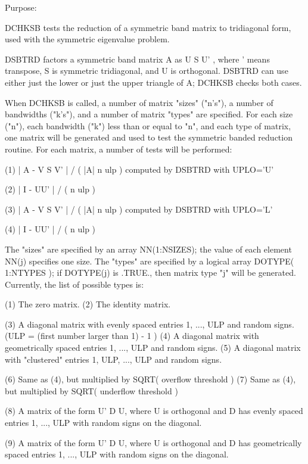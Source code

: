 \begin{DoxyParagraph}{Purpose\+: }
\begin{DoxyVerb} DCHKSB tests the reduction of a symmetric band matrix to tridiagonal
 form, used with the symmetric eigenvalue problem.

 DSBTRD factors a symmetric band matrix A as  U S U' , where ' means
 transpose, S is symmetric tridiagonal, and U is orthogonal.
 DSBTRD can use either just the lower or just the upper triangle
 of A; DCHKSB checks both cases.

 When DCHKSB is called, a number of matrix "sizes" ("n's"), a number
 of bandwidths ("k's"), and a number of matrix "types" are
 specified.  For each size ("n"), each bandwidth ("k") less than or
 equal to "n", and each type of matrix, one matrix will be generated
 and used to test the symmetric banded reduction routine.  For each
 matrix, a number of tests will be performed:

 (1)     | A - V S V' | / ( |A| n ulp )  computed by DSBTRD with
                                         UPLO='U'

 (2)     | I - UU' | / ( n ulp )

 (3)     | A - V S V' | / ( |A| n ulp )  computed by DSBTRD with
                                         UPLO='L'

 (4)     | I - UU' | / ( n ulp )

 The "sizes" are specified by an array NN(1:NSIZES); the value of
 each element NN(j) specifies one size.
 The "types" are specified by a logical array DOTYPE( 1:NTYPES );
 if DOTYPE(j) is .TRUE., then matrix type "j" will be generated.
 Currently, the list of possible types is:

 (1)  The zero matrix.
 (2)  The identity matrix.

 (3)  A diagonal matrix with evenly spaced entries
      1, ..., ULP  and random signs.
      (ULP = (first number larger than 1) - 1 )
 (4)  A diagonal matrix with geometrically spaced entries
      1, ..., ULP  and random signs.
 (5)  A diagonal matrix with "clustered" entries 1, ULP, ..., ULP
      and random signs.

 (6)  Same as (4), but multiplied by SQRT( overflow threshold )
 (7)  Same as (4), but multiplied by SQRT( underflow threshold )

 (8)  A matrix of the form  U' D U, where U is orthogonal and
      D has evenly spaced entries 1, ..., ULP with random signs
      on the diagonal.

 (9)  A matrix of the form  U' D U, where U is orthogonal and
      D has geometrically spaced entries 1, ..., ULP with random
      signs on the diagonal.


\end{DoxyVerb}
\end{DoxyParagraph}
